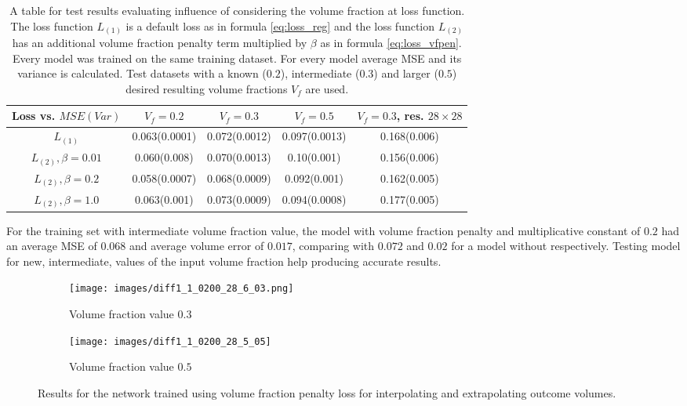 \begin{table}[h]
	\begin{center}
\begin{tabular}{ |c|c|c|c|c| }
	\hline
	Loss vs. $MSE(Var)$ & $V_f=0.2$ & $V_f=0.3$& $V_f=0.5$ &  $V_f=0.3$, res. $28\times 28$\\ 
	\hline
	$L_{(1)}$ & 0.063(0.0001) & 0.072(0.0012) & 0.097(0.0013) & 0.168(0.006)  \\
	$L_{(2)}, \beta=0.01$ & 0.060(0.008) & 0.070(0.0013) & 0.10(0.001) & 0.156(0.006)\\
	$L_{(2)}, \beta=0.2$ & 0.058(0.0007) & 0.068(0.0009) & 0.092(0.001) & 0.162(0.005) \\
	$L_{(2)}, \beta=1.0$ & 0.063(0.001) & 0.073(0.0009) & 0.094(0.0008) & 0.177(0.005) \\
	\hline
\end{tabular}
	\end{center}
\caption{A table for test results evaluating influence of considering the volume fraction at loss function. 
The loss function $L_{(1)}$ is a default loss as in formula \ref{eq:loss_reg} and the loss function $L_{(2)}$ has an additional volume fraction penalty term multiplied by $\beta$ as in formula \ref{eq:loss_vfpen}. 
Every model was trained on the same training dataset. For every model average MSE and its variance is calculated. 
Test datasets with a known ($0.2$), intermediate ($0.3$) and larger ($0.5$) desired resulting volume fractions $V_{f}$ are used.}\label{tab:vf_full}
\end{table}
For the training set with intermediate volume fraction value, the model with volume fraction penalty and multiplicative constant of $0.2$ had an average MSE of $0.068$ and average volume error of $0.017$, comparing with $0.072$ and $0.02$ for a model without respectively.
Testing model for new, intermediate, values of the input volume fraction help producing accurate results.
\begin{figure}[H]
	\begin{subfigure}[b]{0.5\linewidth}
		\centering
		\texttt{[image: images/diff1\_1\_0200\_28\_6\_03.png]}
		\caption{Volume fraction value $0.3$}
		\label{fig:vf_example_1}
	\end{subfigure}
	\begin{subfigure}[b]{0.5\linewidth}
		\centering
		\texttt{[image: images/diff1\_1\_0200\_28\_5\_05]}
		\caption{Volume fraction value $0.5$ }
		\label{fig:vf_example_2}
	\end{subfigure}
 \caption{Results for the network trained using volume fraction penalty loss for interpolating and extrapolating outcome volumes.}
	\label{fig:vf_example}
\end{figure}
